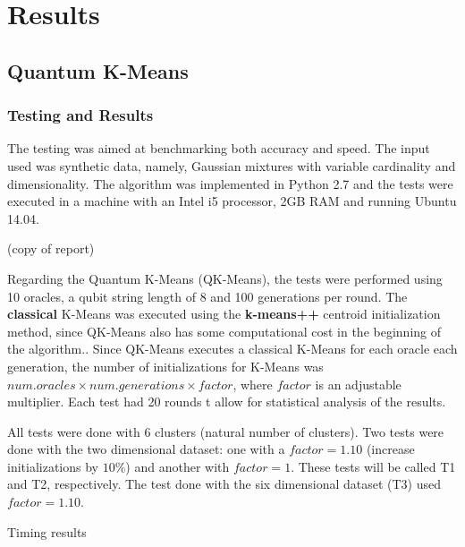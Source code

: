 \section{Results}
\subsection{Quantum K-Means}
\subsubsection{Testing and Results}
The testing was aimed at benchmarking both accuracy and speed. The input used was synthetic data, namely, Gaussian mixtures with variable cardinality and dimensionality. The algorithm was implemented in Python 2.7 and the tests were executed in a machine with an Intel i5 processor, 2GB RAM and running Ubuntu 14.04.

(copy of report)

Regarding the Quantum K-Means (QK-Means), the tests were performed using 10 oracles, a qubit string length of 8 and 100 generations per round. The \textbf{classical} K-Means was executed using the \textbf{k-means++} centroid initialization method, since QK-Means also has some computational cost in the beginning of the algorithm.. Since QK-Means executes a classical K-Means for each oracle each generation, the number of initializations for K-Means was $num.oracles \times num.generations \times factor$, where $factor$ is an adjustable multiplier. Each test had 20 rounds t allow for statistical analysis of the results.

All tests were done with 6 clusters (natural number of clusters). Two tests were done with the two dimensional dataset: one with a $factor=1.10$ (increase initializations by $10\%$) and another with $factor=1$. These tests will be called T1 and T2, respectively. The test done with the six dimensional dataset (T3) used $factor=1.10$.

Timing results


